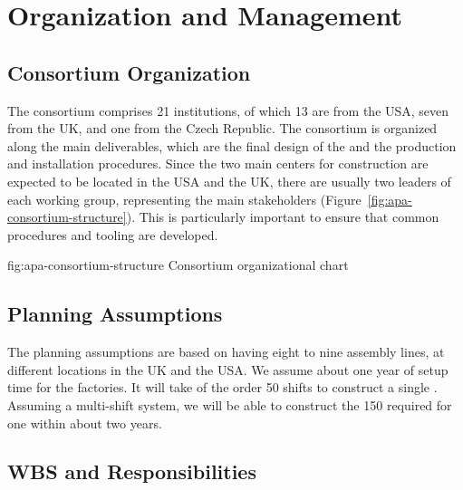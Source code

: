 \section{Organization and Management}
\label{sec:fdsp-apa-org}

\subsection{ Consortium Organization}
\label{sec:fdsp-apa-org-consortium}

The  consortium comprises \num{21} institutions, of which \num{13} are from the USA, seven from the UK, and one from the Czech Republic. The consortium is organized along the main deliverables, which are the final design of the  and the  production and installation procedures. Since the two main centers for  construction are expected to be located in the USA and the UK, there are usually two leaders of each working group, representing the main stakeholders (Figure~\ref{fig:apa-consortium-structure}). This is particularly important to ensure that common procedures and tooling are developed. 

\begin{dunefigure}{fig:apa-consortium-structure}
{ Consortium organizational chart}
\end{dunefigure}


\subsection{Planning Assumptions}
\label{sec:fdsp-apa-org-assmp}

The planning assumptions are based on having eight to nine  assembly lines, at different locations in the UK and the USA. 
We assume about one year of setup time for the factories.
It will take of the order \num{50} shifts to construct a single . Assuming a multi-shift system, we will be able to construct the \num{150}  required for one  %
within about two years.

\subsection{WBS and Responsibilities}
\label{sec:fdsp-apa-org-wbs}

